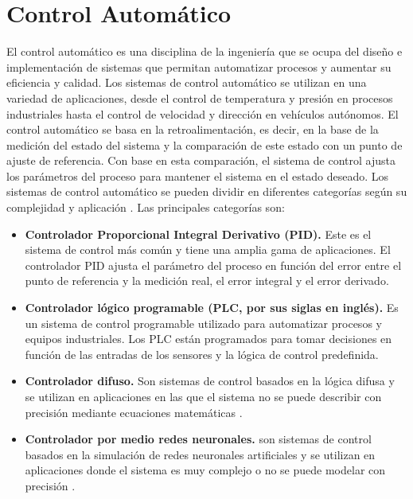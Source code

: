 \section{Control Automático}
El control automático es una disciplina de la ingeniería que se ocupa del diseño e implementación de sistemas que permitan automatizar procesos y aumentar su eficiencia y calidad. Los sistemas de control automático se utilizan en una variedad de aplicaciones, desde el control de temperatura y presión en procesos industriales hasta el control de velocidad y dirección en vehículos autónomos. El control automático se basa en la retroalimentación, es decir, en la base de la medición del estado del sistema y la comparación de este estado con un punto de ajuste de referencia. Con base en esta comparación, el sistema de control ajusta los parámetros del proceso para mantener el sistema en el estado deseado. Los sistemas de control automático se pueden dividir en diferentes categorías según su complejidad y aplicación \cite{ogata2010modern}. Las principales categorías son:
\begin{itemize}
    \item \textbf{Controlador Proporcional Integral Derivativo (PID).} Este es el sistema de control más común y tiene una amplia gama de aplicaciones. El controlador PID ajusta el parámetro del proceso en función del error entre el punto de referencia y la medición real, el error integral y el error derivado.
    \item \textbf{Controlador lógico programable (PLC, por sus siglas en inglés).} Es un sistema de control programable utilizado para automatizar procesos y equipos industriales. Los PLC están programados para tomar decisiones en función de las entradas de los sensores y la lógica de control predefinida.
    \item \textbf{Controlador difuso.} Son sistemas de control basados en la lógica difusa y se utilizan en aplicaciones en las que el sistema no se puede describir con precisión mediante ecuaciones matemáticas \cite{mamdani1975experiment}.
    \item \textbf{Controlador por medio redes neuronales.} son sistemas de control basados en la simulación de redes neuronales artificiales y se utilizan en aplicaciones donde el sistema es muy complejo o no se puede modelar con precisión \cite{bishop1995neural}.
\end{itemize}

